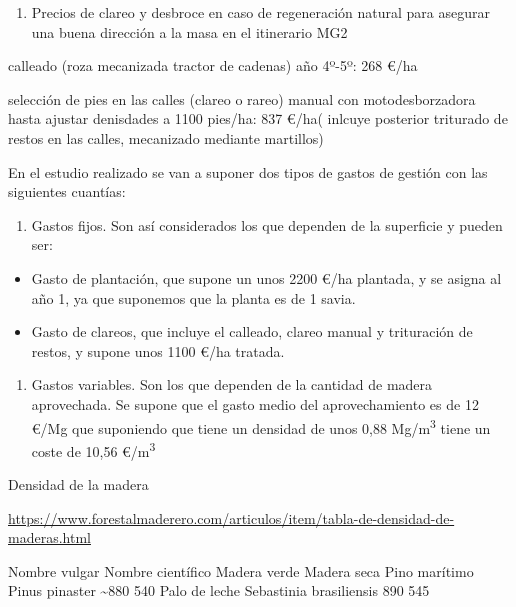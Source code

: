 \documentclass[]{article}
\providecommand{\tightlist}{%
  \setlength{\itemsep}{0pt}\setlength{\parskip}{0pt}}
\begin{document}
\begin{enumerate}
\def\labelenumi{\arabic{enumi}.}
\tightlist
\item
  Precios de clareo y desbroce en caso de regeneración natural para
  asegurar una buena dirección a la masa en el itinerario MG2
\end{enumerate}

calleado (roza mecanizada tractor de cadenas) año 4º-5º: 268 \euro/ha

selección de pies en las calles (clareo o rareo) manual con
motodesborzadora hasta ajustar denisdades a 1100 pies/ha: 837 \euro/ha(
inlcuye posterior triturado de restos en las calles, mecanizado mediante
martillos)

En el estudio realizado se van a suponer dos tipos de gastos de gestión
con las siguientes cuantías:

\begin{enumerate}
\def\labelenumi{\arabic{enumi}.}
\tightlist
\item
  Gastos fijos. Son así considerados los que dependen de la superficie y
  pueden ser:
\end{enumerate}

\begin{itemize}
\tightlist
\item
  Gasto de plantación, que supone un unos 2200 \euro/ha plantada, y se
  asigna al año 1, ya que suponemos que la planta es de 1 savia.
\item
  Gasto de clareos, que incluye el calleado, clareo manual y trituración
  de restos, y supone unos 1100 \euro/ha tratada.
\end{itemize}

\begin{enumerate}
\def\labelenumi{\arabic{enumi}.}
\setcounter{enumi}{1}
\tightlist
\item
  Gastos variables. Son los que dependen de la cantidad de madera
  aprovechada. Se supone que el gasto medio del aprovechamiento es de 12
  \euro/Mg que suponiendo que tiene un densidad de unos 0,88
  Mg/m\textsuperscript{3} tiene un coste de 10,56
  \euro/m\textsuperscript{3}
\end{enumerate}

Densidad de la madera

\url{https://www.forestalmaderero.com/articulos/item/tabla-de-densidad-de-maderas.html}

Nombre vulgar Nombre científico Madera verde Madera seca Pino marítimo
Pinus pinaster \textasciitilde{}880 540 Palo de leche Sebastinia
brasiliensis 890 545
\end{document}
